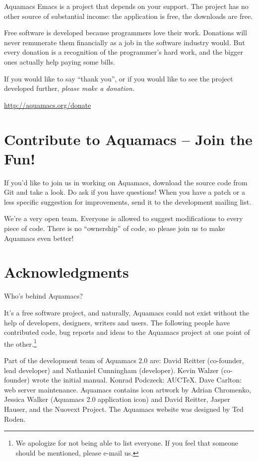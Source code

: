 \documentclass[11pt,letterpaper]{article}
\begin{document}
Aquamacs Emacs is a project that depends on your support. The project
has no other source of substantial income: the application is free,
the downloads are free. 

Free software is developed because programmers love their work. Donations will never remunerate them financially as a job in the software industry would. But every donation is a recognition of the programmer's hard work, and the bigger ones actually help paying some bills.

If you would like to say ``thank you'', or if you would like to see
the project developed further, \emph{please make a donation.}

\url{http://aquamacs.org/donate}


\section {Contribute to Aquamacs -- Join the Fun!}

If you'd like to join us in working on Aquamacs, download the source
code from Git and take a look. Do ask if you have questions! When you
have a patch or a less specific suggestion for improvements, send it
to the development mailing list.

We're a very open team. Everyone is allowed to suggest modifications
to every piece of code. There is no ``ownership'' of code, so please
join us to make Aquamacs even better!


\section{Acknowledgments}

Who's behind Aquamacs?

It's a free software project, and naturally, Aquamacs could not exist
without the help of developers, designers, writers and users. The
following people have contributed code, bug reports and ideas to the
Aquamacs project at one point of the other.\footnote{We apologize for not being able to list everyone.  If you feel that someone should be mentioned, please e-mail us.}

Part of the development team of Aquamacs 2.0 are:  David Reitter (co-founder, lead developer) and Nathaniel Cunningham (developer).  
Kevin Walzer (co-founder) wrote the initial manual. Konrad Podczeck: AUCTeX.  Dave Carlton: web server maintenance.  Aquamacs contains icon artwork by Adrian Chromenko, Jessica Walker (Aquamacs 2.0 application icon) and David Reitter,
Jasper Hauser, and the Nuovext Project.  The Aquamacs website was designed by Ted Roden.
\end{document}

